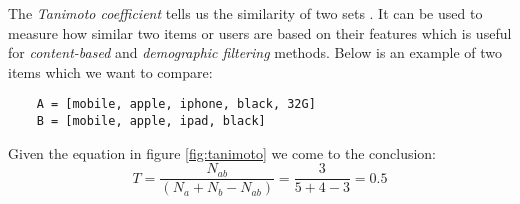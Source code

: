 The \textit{Tanimoto coefficient} tells us the similarity of two sets \cite{segaran07}. It can be used to measure how similar two items or users are based on their features which is useful for \textit{content-based} and \textit{demographic filtering} methods. Below is an example of two items which we want to compare:

\lstset{language=Python}
\begin{lstlisting}
    A = [mobile, apple, iphone, black, 32G]
    B = [mobile, apple, ipad, black]
\end{lstlisting}

Given the equation in figure \ref{fig:tanimoto} we come to the conclusion: \[T = \frac{N_{ab}}{(N_a + N_b - N_{ab})} = \frac{3}{5 + 4 - 3} = 0.5\]